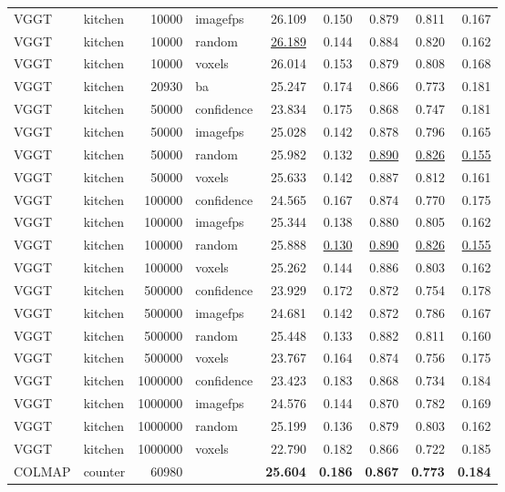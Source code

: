 \begin{table}[H]
\begin{tabular}{llrlrrrrr}
VGGT & kitchen & 10000 & imagefps & 26.109 & 0.150 & 0.879 & 0.811 & 0.167 \\
VGGT & kitchen & 10000 & random & \underline{26.189} & 0.144 & 0.884 & 0.820 & 0.162 \\
VGGT & kitchen & 10000 & voxels & 26.014 & 0.153 & 0.879 & 0.808 & 0.168 \\
VGGT & kitchen & 20930 & ba & 25.247 & 0.174 & 0.866 & 0.773 & 0.181 \\
VGGT & kitchen & 50000 & confidence & 23.834 & 0.175 & 0.868 & 0.747 & 0.181 \\
VGGT & kitchen & 50000 & imagefps & 25.028 & 0.142 & 0.878 & 0.796 & 0.165 \\
VGGT & kitchen & 50000 & random & 25.982 & 0.132 & \underline{0.890} & \underline{0.826} & \underline{0.155} \\
VGGT & kitchen & 50000 & voxels & 25.633 & 0.142 & 0.887 & 0.812 & 0.161 \\
VGGT & kitchen & 100000 & confidence & 24.565 & 0.167 & 0.874 & 0.770 & 0.175 \\
VGGT & kitchen & 100000 & imagefps & 25.344 & 0.138 & 0.880 & 0.805 & 0.162 \\
VGGT & kitchen & 100000 & random & 25.888 & \underline{0.130} & \underline{0.890} & \underline{0.826} & \underline{0.155} \\
VGGT & kitchen & 100000 & voxels & 25.262 & 0.144 & 0.886 & 0.803 & 0.162 \\
VGGT & kitchen & 500000 & confidence & 23.929 & 0.172 & 0.872 & 0.754 & 0.178 \\
VGGT & kitchen & 500000 & imagefps & 24.681 & 0.142 & 0.872 & 0.786 & 0.167 \\
VGGT & kitchen & 500000 & random & 25.448 & 0.133 & 0.882 & 0.811 & 0.160 \\
VGGT & kitchen & 500000 & voxels & 23.767 & 0.164 & 0.874 & 0.756 & 0.175 \\
VGGT & kitchen & 1000000 & confidence & 23.423 & 0.183 & 0.868 & 0.734 & 0.184 \\
VGGT & kitchen & 1000000 & imagefps & 24.576 & 0.144 & 0.870 & 0.782 & 0.169 \\
VGGT & kitchen & 1000000 & random & 25.199 & 0.136 & 0.879 & 0.803 & 0.162 \\
VGGT & kitchen & 1000000 & voxels & 22.790 & 0.182 & 0.866 & 0.722 & 0.185 \\
\midrule
COLMAP & counter & 60980 &  & \textbf{25.604} & \textbf{0.186} & \textbf{0.867} & \textbf{0.773} & \textbf{0.184} \\

\end{tabular}
\end{table}
